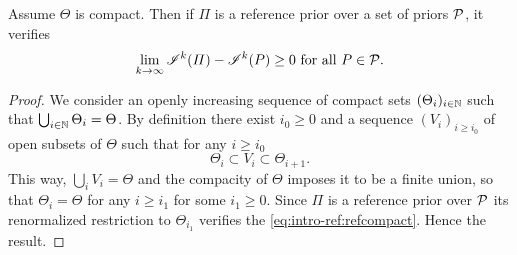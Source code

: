 



\begin{prop}
    Assume $\Theta$ is compact. Then if $\varPi$ is a reference prior over a set of priors $\mathcal{P}$, it verifies
        \begin{equation}\label{eq:intro-ref:refcompact}
            \lim_{k\rightarrow\infty} \mathscr{I}^k(\varPi)-\mathscr{I}^k(P) \geq0\text{\ for all\ } P\in\mathcal{P}.
        \end{equation}
\end{prop}


\begin{proof} 
We consider an openly increasing sequence of compact sets $(\Theta_i)_{i\in\mathbb{N}}$ such that $\bigcup_{i\in\mathbb{N}}\Theta_i = \Theta$.
By definition there exist $i_0\geq0$ and a sequence $(V_i)_{i\geq i_0}$ of open subsets of $\Theta$  such that for any $i\geq i_0$
    \begin{equation}
        \Theta_i\subset V_i\subset \Theta_{i+1}.
    \end{equation}
This way, $\bigcup_iV_i=\Theta$ and the compacity of $\Theta$ imposes it to  be a finite union, so that $\Theta_i=\Theta$ for any $i\geq i_1$ for some $i_1\geq0$.
Since $\varPi$ is a reference prior over $\mathcal{P}$ its renormalized restriction to $\Theta_{i_1}$ verifies the \cref{eq:intro-ref:refcompact}. Hence the result.
\end{proof}



